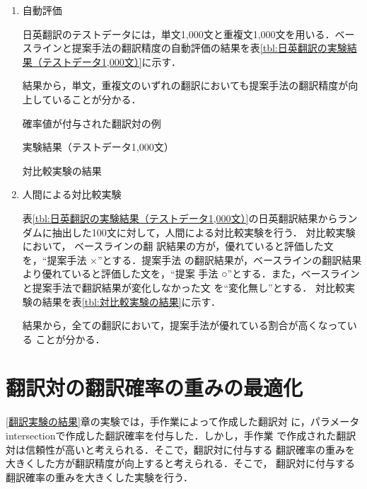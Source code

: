 \documentclass[japanese]{jnlp_1.4}
\begin{document}
\begin{enumerate}
\item{自動評価}

日英翻訳のテストデータには，単文1,000文と重複文1,000文を用いる．ベー
スラインと提案手法の翻訳精度の自動評価の結果を表\ref{tbl:日英翻訳の実験結果（テストデータ1,000文）}に示す．

結果から，単文，重複文のいずれの翻訳においても提案手法の翻訳精度が向
上していることが分かる．

\begin{table}[b]
\caption{確率値が付与された翻訳対の例}
\label{tbl:確率値が付与された翻訳対の例}

\end{table}
\begin{table}[b]
\caption{実験結果（テストデータ1,000文）}
\label{tbl:日英翻訳の実験結果（テストデータ1,000文）}

\end{table}
\begin{table}[b]
\caption{対比較実験の結果}
\label{tbl:対比較実験の結果}

\end{table}


\item{人間による対比較実験}
\label{sec:対比較実験}

表\ref{tbl:日英翻訳の実験結果（テストデータ1,000文）}の日英翻訳結果からラン
ダムに抽出した100文に対して，人間による対比較実験を行う．
対比較実験において，
ベースラインの翻
訳結果の方が，優れていると評価した文を，``提案手法 ×''とする．提案手法
の翻訳結果が，ベースラインの翻訳結果より優れていると評価した文を，``提案
手法 ○''とする．また，ベースラインと提案手法で翻訳結果が変化しなかった文
を``変化無し''とする．
対比較実験の結果を表\ref{tbl:対比較実験の結果}に示す．



結果から，全ての翻訳において，提案手法が優れている割合が高くなっている
ことが分かる．

\end{enumerate}



\section{翻訳対の翻訳確率の重みの最適化}
\label{sec:翻訳対の翻訳確率の重みの最適化}


\ref{翻訳実験の結果}章の実験では，手作業によって作成した翻訳対
に，パラメータintersectionで作成した翻訳確率を付与した．しかし，手作業
で作成された翻訳対は信頼性が高いと考えられる．そこで，翻訳対に付与する
翻訳確率の重みを大きくした方が翻訳精度が向上すると考えられる．そこで，
翻訳対に付与する翻訳確率の重みを大きくした実験を行う．
\end{document}
